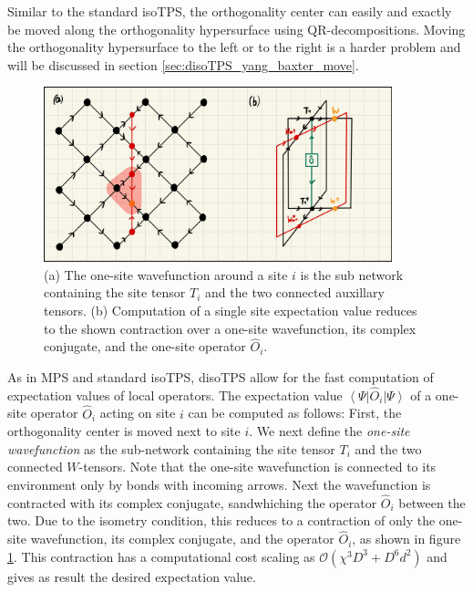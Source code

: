 Similar to the standard isoTPS, the orthogonality center can easily and exactly be moved along the orthogonality hypersurface using QR-decompositions. Moving the orthogonality hypersurface to the left or to the right is a harder problem and will be discussed in section \ref{sec:disoTPS_yang_baxter_move}. \par
\begin{figure}
	\centering
	\includegraphics[width=0.9\textwidth]{figures/Tensor_Networks/disoTPS_onesite_expectation_value.jpeg}
	\caption{(a) The one-site wavefunction around a site $i$ is the sub network containing the site tensor $T_i$ and the two connected auxillary tensors. (b) Computation of a single site expectation value reduces to the shown contraction over a one-site wavefunction, its complex conjugate, and the one-site operator $\hat{O}_i$.}
	\label{fig:disoTPS_onesite_expectation_value}
\end{figure}
As in MPS and standard isoTPS, disoTPS allow for the fast computation of expectation values of local operators. The expectation value $\left\langle\Psi\right|\hat{O}_i\left|\Psi\right\rangle$ of a one-site operator $\hat{O}_i$ acting on site $i$ can be computed as follows: First, the orthogonality center is moved next to site $i$. We next define the \textit{one-site wavefunction} as the sub-network containing the site tensor $T_i$ and the two connected $W$-tensors. Note that the one-site wavefunction is connected to its environment only by bonds with incoming arrows. Next the wavefunction is contracted with its complex conjugate, sandwhiching the operator $\hat{O}_i$ between the two. Due to the isometry condition, this reduces to a contraction of only the one-site wavefunction, its complex conjugate, and the operator $\hat{O}_i$, as shown in figure \ref{fig:disoTPS_onesite_expectation_value}. This contraction has a computational cost scaling as $\mathcal{O}\left(\chi^3 D^3 + D^6d^2\right)$ and gives as result the desired expectation value. \par
